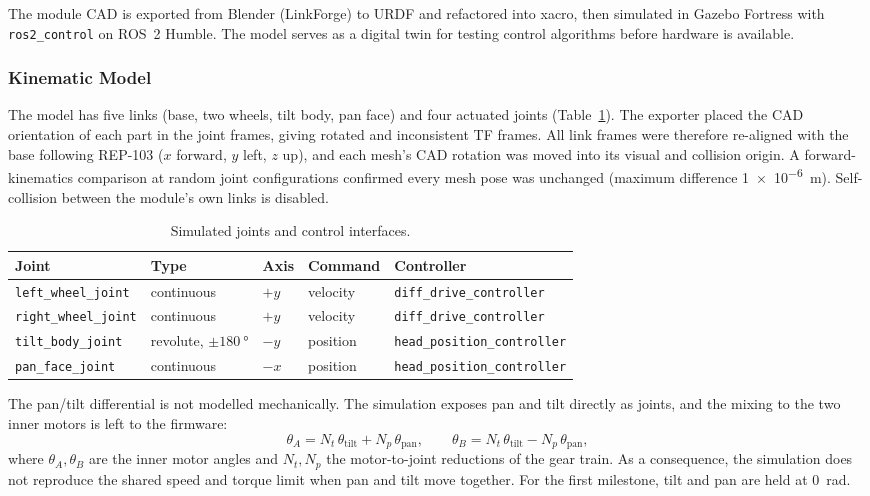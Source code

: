 \documentclass[12pt,a4paper]{article}
\begin{document}
The module CAD is exported from Blender (LinkForge) to URDF and refactored into xacro, then simulated in Gazebo Fortress with \texttt{ros2\_control} on ROS~2 Humble. The model serves as a digital twin for testing control algorithms before hardware is available.

\subsubsection{Kinematic Model}

The model has five links (base, two wheels, tilt body, pan face) and four actuated joints (Table~\ref{tab:sim-joints}). The exporter placed the CAD orientation of each part in the joint frames, giving rotated and inconsistent TF frames. All link frames were therefore re-aligned with the base following REP-103 ($x$ forward, $y$ left, $z$ up), and each mesh's CAD rotation was moved into its visual and collision origin. A forward-kinematics comparison at random joint configurations confirmed every mesh pose was unchanged (maximum difference \SI{1e-6}{m}). Self-collision between the module's own links is disabled.

\begin{table}[H]
	\centering
	\caption{Simulated joints and control interfaces.}
	\label{tab:sim-joints}
	\small
	\begin{tabular}{lllll}
		\toprule
		\textbf{Joint} & \textbf{Type} & \textbf{Axis} & \textbf{Command} & \textbf{Controller} \\
		\midrule
		\texttt{left\_wheel\_joint}  & continuous & $+y$ & velocity & \texttt{diff\_drive\_controller} \\
		\texttt{right\_wheel\_joint} & continuous & $+y$ & velocity & \texttt{diff\_drive\_controller} \\
		\texttt{tilt\_body\_joint}   & revolute, $\pm\SI{180}{\degree}$ & $-y$ & position & \texttt{head\_position\_controller} \\
		\texttt{pan\_face\_joint}    & continuous & $-x$ & position & \texttt{head\_position\_controller} \\
		\bottomrule
	\end{tabular}
\end{table}

The pan/tilt differential is not modelled mechanically. The simulation exposes pan and tilt directly as joints, and the mixing to the two inner motors is left to the firmware:
\begin{equation}
	\theta_A = N_t\,\theta_{\text{tilt}} + N_p\,\theta_{\text{pan}}, \qquad
	\theta_B = N_t\,\theta_{\text{tilt}} - N_p\,\theta_{\text{pan}},
\end{equation}
where $\theta_A, \theta_B$ are the inner motor angles and $N_t, N_p$ the motor-to-joint reductions of the gear train. As a consequence, the simulation does not reproduce the shared speed and torque limit when pan and tilt move together. For the first milestone, tilt and pan are held at \SI{0}{rad}.
\end{document}
